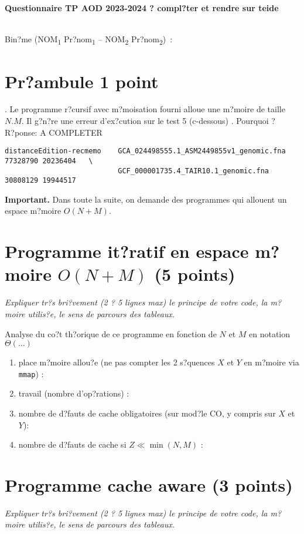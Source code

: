 \documentclass[10pt,a4paper]{article}
\begin{document}
\thispagestyle{empty}

\noindent\centerline{\bf\large Questionnaire  TP AOD 2023-2024 ? compl?ter et rendre sur teide  } \\
Bin?me 
(NOM\textsubscript{1} Pr?nom\textsubscript{1} --
 NOM\textsubscript{2} Pr?nom\textsubscript{2})
\,: \dotfill

\section{Pr?ambule 1 point}.
Le programme r?cursif avec m?moisation fourni alloue une m?moire de taille $N.M$.
Il g?n?re une erreur d'ex?cution sur le test 5 (c-dessous) . Pourquoi ? \\
R?ponse:  A COMPLETER 
\begin{verbatim}
distanceEdition-recmemo    GCA_024498555.1_ASM2449855v1_genomic.fna 77328790 20236404   \
                           GCF_000001735.4_TAIR10.1_genomic.fna 30808129 19944517 
\end{verbatim}

{\noindent\bf{Important}.} Dans toute la suite, on demande des programmes qui allouent un espace m?moire $O(N+M)$.

\section{Programme it?ratif en espace m?moire $O(N+M)$ (5 points)}
{\em Expliquer tr?s bri?vement (2 ? 5 lignes max) le principe de votre code, la m?moire utilis?e, le sens de parcours des tableaux.}
\vspace*{1.0cm}

Analyse du co?t th?orique de ce  programme en fonction de $N$ et $M$  en notation $\Theta(...)$ 
\begin{enumerate}
  \item place m?moire allou?e (ne pas compter les 2 s?quences $X$ et $Y$ en m?moire via {\tt mmap}) : 
  \item travail (nombre d'op?rations) : 
  \item nombre de d?fauts de cache obligatoires (sur mod?le CO, y compris sur $X$ et $Y$):
  \item nombre de d?fauts de cache si $Z \ll \min(N,M)$ : 
\end{enumerate}

\section{Programme cache aware  (3 points)}
{\em Expliquer tr?s bri?vement (2 ? 5 lignes max) le principe de votre code, la m?moire utilis?e, le sens de parcours des tableaux.}
\vspace*{1.0cm}
\end{document}
